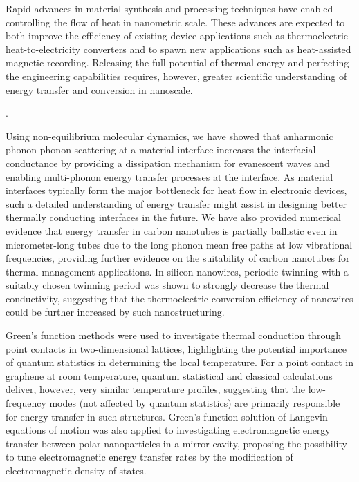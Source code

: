 
Rapid advances in material synthesis and processing techniques have enabled controlling the flow of heat in nanometric scale. These advances are expected to both improve the efficiency of existing device applications such as thermoelectric heat-to-electricity converters and to spawn new applications such as heat-assisted magnetic recording. Releasing the full potential of thermal energy and perfecting the engineering capabilities requires, however, greater scientific understanding of energy transfer and conversion in nanoscale.

. %

Using non-equilibrium molecular dynamics, we have showed that anharmonic phonon-phonon scattering at a material interface increases the interfacial conductance by providing a dissipation mechanism for evanescent waves and enabling multi-phonon energy transfer processes at the interface. As material interfaces typically form the major bottleneck for heat flow in electronic devices, such a detailed understanding of energy transfer might assist in designing better thermally conducting interfaces in the future. We have also provided numerical evidence that energy transfer in carbon nanotubes is partially ballistic even in micrometer-long tubes due to the long phonon mean free paths at low vibrational frequencies, providing further evidence on the suitability of carbon nanotubes for thermal management applications. In silicon nanowires, periodic twinning with a suitably chosen twinning period was shown to strongly decrease the thermal conductivity, suggesting that the thermoelectric conversion efficiency of nanowires could be further increased by such nanostructuring. 

Green's function methods were used to investigate thermal conduction through point contacts in two-dimensional lattices, highlighting the potential importance of quantum statistics in determining the local temperature. For a point contact in graphene at room temperature, quantum statistical and classical calculations deliver, however, very similar temperature profiles, suggesting that the low-frequency modes (not affected by quantum statistics) are primarily responsible for energy transfer in such structures. Green's function solution of Langevin equations of motion was also applied to investigating electromagnetic energy transfer between polar nanoparticles in a mirror cavity, proposing the possibility to tune electromagnetic energy transfer rates by the modification of electromagnetic density of states. 


